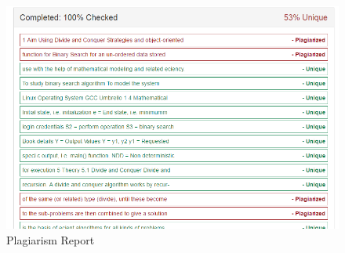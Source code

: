 \documentclass[a4paper,12pt]{article}
\begin{document}
\begin{figure}[htb!]
	\centering
	\includegraphics[scale = 0.80]{Untitled.png}
	\caption{Plagiarism Report }
	\label{Plagiarism Report}
\end{figure}
\end{document}

